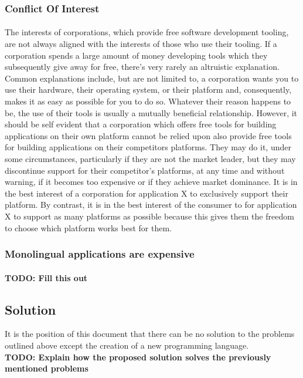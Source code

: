 \documentclass[hidelinks]{article}
\begin{document}
\subsubsection{Conflict Of Interest}\paragraph{}The interests of corporations, which provide free software development tooling, are not always aligned with the interests of those who use their tooling. If a corporation spends a large amount of money developing tools which they subsequently give away for free, there's very rarely an altruistic explanation. Common explanations include, but are not limited to, a corporation wants you to use their hardware, their operating system, or their platform and, consequently, makes it as easy as possible for you to do so. Whatever their reason happens to be, the use of their tools is usually a mutually beneficial relationship. However, it should be self evident that a corporation which offers free tools for building applications on their own platform cannot be relied upon also provide free tools for building applications on their competitors platforms. They may do it, under some circumstances, particularly if they are not the market leader, but they may discontinue support for their competitor's platforms, at any time and without warning, if it becomes too expensive or if they achieve market dominance. It is in the best interest of a corporation for application X to exclusively support their platform. By contrast, it is in the best interest of the consumer to for application X to support as many platforms as possible because this gives them the freedom to choose which platform works best for them. 
\subsubsection{Monolingual applications are expensive}\paragraph{}
\textbf{TODO: Fill this out}
\subsection{Solution}
It is the position of this document that there can be no solution to the problems outlined above except the creation of a new programming language.
\\
\textbf{TODO: Explain how the proposed solution solves the previously mentioned problems}
\end{document}
